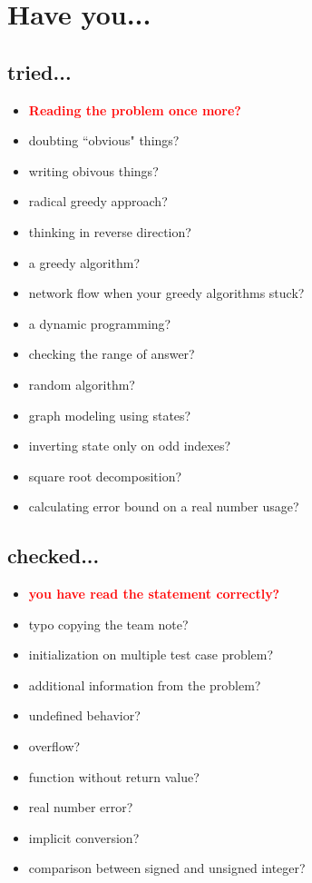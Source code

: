 \documentclass[portrait, 8pt, a4paper, oneside, twocolumn]{extarticle}
\begin{document}
\maketitlepage


\section{Have you...}

\subsection{tried...}

\begin{itemize}
    \item \textcolor{red}{\textbf{Reading the problem once more?}}
    \item doubting ``obvious" things?
    \item writing obivous things?
    \item radical greedy approach?
    \item thinking in reverse direction?
    \item a greedy algorithm?
    \item network flow when your greedy algorithms stuck?
    \item a dynamic programming?
    \item checking the range of answer?
    \item random algorithm?
    \item graph modeling using states?
    \item inverting state only on odd indexes?
    \item square root decomposition?
    \item calculating error bound on a real number usage?
\end{itemize}

\subsection{checked...}

\begin{itemize}
    \item \textcolor{red}{\textbf{you have read the statement correctly?}}
    \item typo copying the team note?
    \item initialization on multiple test case problem?
    \item additional information from the problem?
    \item undefined behavior?
    \item overflow?
    \item function without return value?
    \item real number error?
    \item implicit conversion?
    \item comparison between signed and unsigned integer?
\end{itemize}
\end{document}
